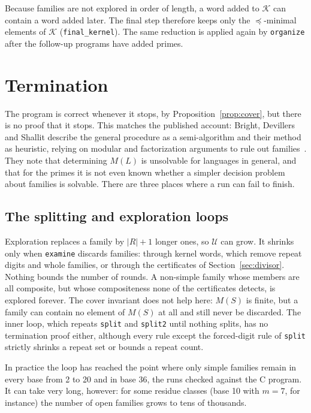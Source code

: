 \documentclass[11pt]{article}
\theoremstyle{definition}
\theoremstyle{remark}
\newcommand{\K}{\mathcal{K}}
\newcommand{\U}{\mathcal{U}}
\newcommand{\code}[1]{\texttt{#1}}
\newcommand{\sw}{\preceq}   %
\begin{document}
Because families are not explored in order of length, a word added to $\K$ can contain a word added later. The final step therefore keeps only the $\sw$-minimal elements of $\K$ (\code{final\_kernel}). The same reduction is applied again by \code{organize} after the follow-up programs have added primes.

\section{Termination}\label{sec:termination}

The program is correct whenever it stops, by Proposition~\ref{prop:cover}, but there is no proof that it stops. This matches the published account: Bright, Devillers and Shallit describe the general procedure as a semi-algorithm and their method as heuristic, relying on modular and factorization arguments to rule out families~\cite{BDS}. They note that determining $M(L)$ is unsolvable for languages in general, and that for the primes it is not even known whether a simpler decision problem about families is solvable. There are three places where a run can fail to finish.

\subsection{The splitting and exploration loops}
Exploration replaces a family by $|R|+1$ longer ones, so $\U$ can grow. It shrinks only when \code{examine} discards families: through kernel words, which remove repeat digits and whole families, or through the certificates of Section~\ref{sec:divisor}. Nothing bounds the number of rounds. A non-simple family whose members are all composite, but whose compositeness none of the certificates detects, is explored forever. The cover invariant does not help here: $M(S)$ is finite, but a family can contain no element of $M(S)$ at all and still never be discarded. The inner loop, which repeats \code{split} and \code{split2} until nothing splits, has no termination proof either, although every rule except the forced-digit rule of \code{split} strictly shrinks a repeat set or bounds a repeat count.

In practice the loop has reached the point where only simple families remain in every base from 2 to 20 and in base 36, the runs checked against the C program. It can take very long, however: for some residue classes (base 10 with $m=7$, for instance) the number of open families grows to tens of thousands.
\end{document}
